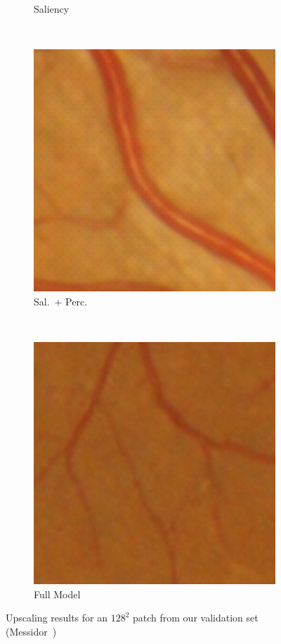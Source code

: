 \documentclass{scrartcl}
\begin{document}
\begin{figure}[htb]
{\begin{subfigure}{0.2\textwidth}
    \caption{Saliency}
\end{subfigure}~
\begin{subfigure}{0.2\textwidth}
\centering
    \includegraphics[width=1.0\textwidth]{patch_sr1_sal_perc_small}
    \caption{Sal.\ + Perc.}
\end{subfigure}~
\begin{subfigure}{0.2\textwidth}
\centering
    \includegraphics[width=1.0\textwidth]{patch_sr1_gan_small}
    \caption{Full Model}
\end{subfigure}
}
\caption{Upscaling results for an $128^2$ patch from our validation set (Messidor~\cite{Messidor})}
\label{fig:messidor-example}
\end{figure}
\end{document}
